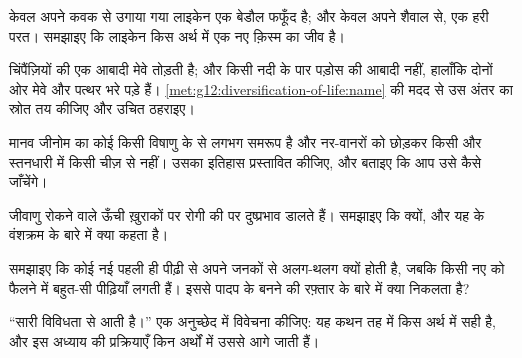 \begin{exercise}[$\star\star$]\label{exo:g12:diversification-of-life:10}
केवल अपने कवक से उगाया गया लाइकेन एक बेडौल फफूँद है; और केवल अपने शैवाल से,
एक हरी परत। समझाइए कि लाइकेन किस अर्थ में एक नए क़िस्म का जीव है।
\end{exercise}

\begin{exercise}[$\star\star$]\label{exo:g12:diversification-of-life:11}
चिंपैंज़ियों की एक आबादी मेवे तोड़ती है; और किसी नदी के पार पड़ोस की आबादी
नहीं, हालाँकि दोनों ओर मेवे और पत्थर भरे पड़े हैं।
\cref{met:g12:diversification-of-life:name} की मदद से उस अंतर का स्रोत तय
कीजिए और उचित ठहराइए।
\end{exercise}

\begin{exercise}[$\star\star\star$]\label{exo:g12:diversification-of-life:12}
मानव जीनोम का कोई  किसी विषाणु के  से लगभग समरूप है और नर-वानरों को
छोड़कर किसी और स्तनधारी में किसी चीज़ से नहीं। उसका इतिहास प्रस्तावित
कीजिए, और बताइए कि आप उसे कैसे जाँचेंगे।
\end{exercise}

\begin{exercise}[$\star\star\star$]\label{exo:g12:diversification-of-life:13}
जीवाणु  रोकने वाले  ऊँची ख़ुराकों पर रोगी की 
पर दुष्प्रभाव डालते हैं। समझाइए कि क्यों, और यह  के वंशक्रम के
बारे में क्या कहता है।
\end{exercise}

\begin{exercise}[$\star\star\star$]\label{exo:g12:diversification-of-life:14}
समझाइए कि कोई नई   पहली ही पीढ़ी से अपने जनकों से अलग-थलग क्यों
होती है, जबकि किसी नए  को फैलने में बहुत-सी पीढ़ियाँ लगती हैं।
इससे पादप  के बनने की रफ़्तार के बारे में क्या निकलता है?
\end{exercise}

\begin{exercise}[$\star\star\star$]\label{exo:g12:diversification-of-life:15}
``सारी विविधता  से आती है।'' एक अनुच्छेद में विवेचना कीजिए: यह
कथन तह में किस अर्थ में सही है, और इस अध्याय की प्रक्रियाएँ किन अर्थों में
उससे आगे जाती हैं।
\end{exercise}

